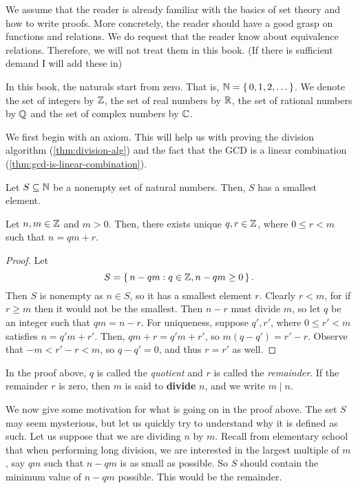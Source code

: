 \documentclass[./algebra-notes.tex]{subfiles}
\begin{document}
We assume that the reader is already familiar with the basics of set theory and
how to write proofs. More concretely, the reader should have a good grasp on
functions and relations. We do request that the reader know about equivalence
relations. Therefore, we will not treat them in this book. (If there is
sufficient demand I will add these in)

In this book, the naturals start from zero. That is, $\mathbb{N} = \set{0, 1, 2,
\dots}$. We denote the set of integers by $\mathbb{Z}$, the set of real numbers by
$\mathbb{R}$, the set of rational numbers by $\mathbb{Q}$ and the set of complex numbers by
$\mathbb{C}$.

We first begin with an axiom. This will help us with proving the division
algorithm (\cref{thm:division-alg}) and the fact that the GCD is a linear
combination (\cref{thm:gcd-is-linear-combination}).
\begin{axiom}
Let $S \subseteq \mathbb{N}$ be a nonempty set of natural numbers. Then, $S$ has a smallest element.
\end{axiom}

\begin{theorem}
\label{thm:division-alg}
    Let $n, m \in \mathbb{Z}$ and $m > 0$. Then, there exists unique $q, r \in \mathbb{Z}$,
    where $0 \leq r < m$ such that $n = qm + r$.
\end{theorem}
\begin{proof}
    Let
    \[
    S = \set{n - qm: q \in \mathbb{Z}, n - qm \geq 0}.
    \]
    Then $S$ is nonempty as $n \in S$, so it has a smallest element $r$. Clearly
    $r < m$, for if $r \geq m$ then it would not be the smallest. Then $n - r$
    must divide $m$, so let $q$ be an integer such that $qm = n-r$. For
    uniqueness, suppose $q', r'$, where $0 \leq r' < m$ satisfies $n = q' m + r'$.
    Then, $qm + r = q'm + r'$, so $m(q-q') = r'-r$. Observe that $-m < r' - r <
    m$, so $q - q' = 0$, and thus $r = r'$ as well.
\end{proof}
In the proof above, $q$ is called the \emph{quotient} and $r$ is called the
\emph{remainder}. If the remainder $r$ is zero, then $m$ is said to
\textbf{divide} $n$, and we write $m \mid n$.

We now give some motivation for what is going on in the proof above. The set $S$
may seem mysterious, but let us quickly try to understand why it is defined as
such. Let us suppose that we are dividing $n$ by $m$. Recall from elementary
school that when performing long division, we are interested in the largest
multiple of $m$, say $qm$ such that $n - qm$ is as small as possible. So $S$
should contain the minimum value of $n-qm$ possible. This would be the
remainder. 
\end{document}
